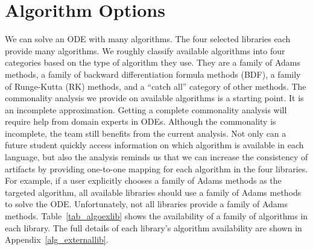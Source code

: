 \section{Algorithm Options}
We can solve an ODE with many algorithms. The four selected libraries each provide many algorithms. We roughly classify available algorithms into four categories based on the type of algorithm they use. They are a family of Adams methods, a family of backward differentiation formula methods (BDF), a family of Runge-Kutta (RK) methods, and a ``catch all'' category of other methods. The commonality analysis we provide on available algorithms is a starting point. It is an incomplete approximation. Getting a complete commonality analysis will require help from domain experts in ODEs. Although the commonality is incomplete, the team still benefits from the current analysis. Not only can a future student quickly access information on which algorithm is available in each language, but also the analysis reminds us that we can increase the consistency of artifacts by providing one-to-one mapping for each algorithm in the four libraries. For example, if a user explicitly chooses a family of Adams methods as the targeted algorithm, all available libraries should use a family of Adams methods to solve the ODE. Unfortunately, not all libraries provide a family of Adams methods. Table~\ref{tab_algoexlib} shows the availability of a family of algorithms in each library. The full details of each library's algorithm availability are shown in Appendix~\ref{alg_externallib}.

